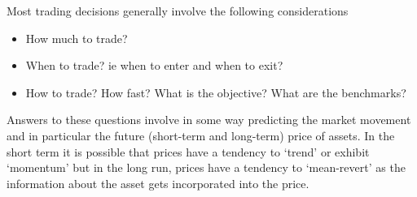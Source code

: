 Most trading decisions generally involve the following considerations
\begin{itemize}
\item How much to trade?
\item When to trade? ie when to enter and when to exit?
\item How to trade? How fast? What is the objective? What are the benchmarks?
\end{itemize}
Answers to these questions involve in some way predicting the market movement and in particular the future (short-term and long-term) price of assets. In the short term it is possible that prices have a tendency to `trend' or exhibit `momentum' but in the long run, prices have a tendency to `mean-revert' as the information about the asset gets incorporated into the price. 


